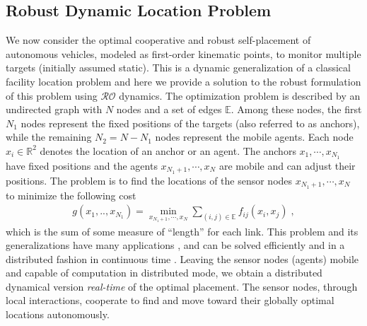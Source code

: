 \documentclass[journal,twoside,web]{ieeecolor}
\begin{document}
\subsection{Robust Dynamic Location Problem}
We now consider the optimal cooperative and robust self-placement of autonomous vehicles, modeled as first-order kinematic points, to monitor multiple targets (initially assumed static). This is a dynamic generalization of a classical facility location problem \cite{farahani2009} and here we provide a solution to the robust formulation of this problem using $\mathcal{RO}$ dynamics. The optimization problem is described by an undirected graph with $N$ nodes and a set of edges ${\mathbb E}$. Among these nodes, the first $N_1$ nodes represent the fixed positions of the targets (also referred to as anchors), while the remaining $N_2 = N - N_1$ nodes represent the mobile agents. Each node $x_i\in \mathbb{R}^2$ denotes the location of an anchor or an agent. The anchors $x_1,\cdots,x_{N_1}$ have fixed positions and the agents $x_{N_1+1},\cdots,x_{N}$ are mobile and can adjust their positions. The problem is to find the locations of the sensor nodes $x_{N_1+1},\cdots, x_N$ to minimize the following cost
\begin{align*}
g(x_1,..,x_{N_1})=\min_{x_{N_1+1},\cdots,x_N} \sum_{(i,j)\in {\mathbb E}}
f_{ij}(x_i, x_j)\;,
\end{align*}
which is the sum of some measure of ``length'' for each link. This problem and its generalizations have many applications \cite{boyd2004}, and can be solved efficiently and in a distributed fashion in continuous time \cite{wang2011}. Leaving the sensor nodes (agents) mobile and capable of computation in distributed mode, we obtain a distributed dynamical version \emph{real-time} of the optimal placement. The sensor nodes, through local interactions, cooperate to find and move toward their globally optimal locations autonomously.
\end{document}
